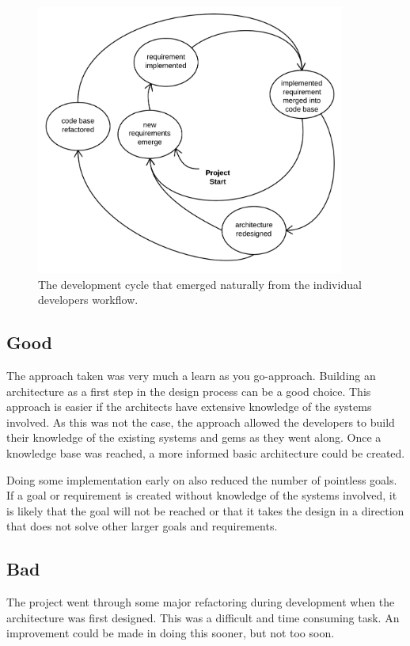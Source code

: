 \begin{figure}[H]
\includegraphics[width=4in]{image/evaluation-development-cycle.png}
\centering
\caption[Development Cycle]{The development cycle that emerged naturally from the individual developers workflow.}
\label{figure:development-cycle}
\end{figure}

\subsection*{Good}
The approach taken was very much a learn as you go-approach. Building an architecture as a first step in the design process can be a good choice. This approach is easier if the architects have extensive knowledge of the systems involved. As this was not the case, the approach allowed the developers to build their knowledge of the existing systems and gems as they went along. Once a knowledge base was reached, a more informed basic architecture could be created.

Doing some implementation early on also reduced the number of pointless goals. If a goal or requirement is created without knowledge of the systems involved, it is likely that the goal will not be reached or that it takes the design in a direction that does not solve other larger goals and requirements.

\subsection*{Bad}
The project went through some major refactoring during development when the architecture was first designed. This was a difficult and time consuming task. An improvement could be made in doing this sooner, but not too soon.

